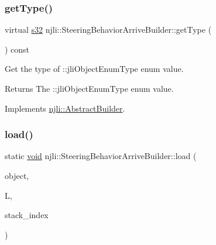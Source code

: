 \mbox{\label{classnjli_1_1_steering_behavior_arrive_builder_a21c8502230046aec05026a8fc761cc67}} 
\subsubsection{\texorpdfstring{get\+Type()}{getType()}}
{\footnotesize\ttfamily virtual \mbox{\hyperlink{_util_8h_aa62c75d314a0d1f37f79c4b73b2292e2}{s32}} njli\+::\+Steering\+Behavior\+Arrive\+Builder\+::get\+Type (\begin{DoxyParamCaption}{ }\end{DoxyParamCaption}) const\hspace{0.3cm}{\ttfamily [virtual]}}

Get the type of \+::jli\+Object\+Enum\+Type enum value.

\begin{DoxyReturn}{Returns}
The \+::jli\+Object\+Enum\+Type enum value. 
\end{DoxyReturn}


Implements \mbox{\hyperlink{classnjli_1_1_abstract_builder_abb4a8161cd71be12807fe85864b67050}{njli\+::\+Abstract\+Builder}}.

\mbox{\label{classnjli_1_1_steering_behavior_arrive_builder_a6c39f5d65b1d2a82eceafb8e48754e34}} 
\subsubsection{\texorpdfstring{load()}{load()}}
{\footnotesize\ttfamily static \mbox{\hyperlink{_thread_8h_af1e856da2e658414cb2456cb6f7ebc66}{void}} njli\+::\+Steering\+Behavior\+Arrive\+Builder\+::load (\begin{DoxyParamCaption}\item[{\mbox{\hyperlink{classnjli_1_1_steering_behavior_arrive_builder}{Steering\+Behavior\+Arrive\+Builder}} \&}]{object,  }\item[{lua\+\_\+\+State $\ast$}]{L,  }\item[{int}]{stack\+\_\+index }\end{DoxyParamCaption})\hspace{0.3cm}{\ttfamily [static]}}

